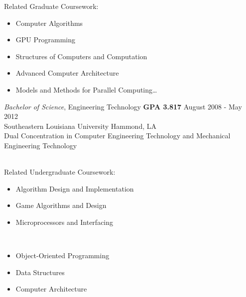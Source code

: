 \documentclass{res}
\begin{document}
\begin{resume}
\begin{multicols}{2}
{		Related Graduate Coursework:  \vspace{-0.175in}
		\begin{itemize}
			\item Computer Algorithms
			\item GPU Programming
			\item Structures of Computers and Computation
			\item Advanced Computer Architecture
			\item Models and Methods for Parallel Computing\ldots
			\end{itemize}
	}
	\end{multicols}

	{\sl Bachelor of Science}, Engineering Technology {\bf GPA 3.817} \hfill August 2008 - May 2012\\
	Southeastern Louisiana University \hfill Hammond, LA\\
	{\footnotesize Dual Concentration in Computer Engineering Technology and Mechanical Engineering Technology}\\\\
		\vspace{-0.49in}
		\begin{multicols}{2}
			{\footnotesize 
				Related Undergraduate Coursework: \vspace{-0.175in}
				\begin{itemize}
					\item Algorithm Design and Implementation
					\item Game Algorithms and Design
					\item Microprocessors and Interfacing 
				\end{itemize} 
				\ %
				\vspace{-0.175in}
				\begin{itemize}
					\item Object-Oriented Programming
					\item Data Structures
					\item Computer Architecture 
				\end{itemize}
			}
		\end{multicols}
		
	

\end{resume}
\end{document}
